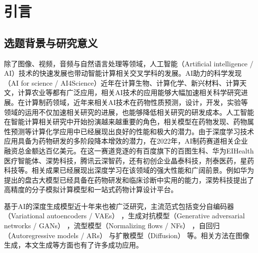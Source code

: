 \titlespacing{\chapter}{0pt}{-50pt}{0pt}
\chapter{引言}
\label{chap:introduction}
\section{选题背景与研究意义}
除了图像、视频，音频与自然语言处理等领域，人工智能（Artificial intelligence / AI）技术的快速发展也带动智能计算相关交叉学科的发展。AI助力的科学发现（AI for science / AI4Science）近年在计算生物、计算化学、新兴材料、计算天文，计算农业等都有广泛应用，相关AI技术的应用能够大幅加速相关科学研究进展。在计算制药领域，近年来相关AI技术在药物性质预测，设计，开发，实验等领域的运用不仅加速相关研究的进展，也能够降低相关研究的研发成本。人工智能在智能计算相关研究中开始扮演越来越重要的角色，相关模型在药物发现、药物属性预测等计算化学应用中已经展现出良好的性能和极大的潜力。由于深度学习技术应用具备为药物研发的多阶段降本增效的潜力，在2022年，AI制药赛道相关企业融资总金额达百亿美元。在这一赛道竞逐的有百度旗下的百图生科、华为EIHealth医疗智能体、深势科技，腾讯云深智药，还有初创企业晶泰科技，剂泰医药，星药科技等。相关成果已经展现出深度学习在该领域的强大性能和广阔前景。例如华为提出的盘古大模型已经具备在药物研发和临床诊断中实用的能力，深势科技提出了高精度的分子模拟计算模型和一站式药物计算设计平台。

基于AI的深度生成模型近十年来也被广泛研究，主流范式包括变分自编码器（Variational autoencoders / VAEs） \cite{vae_kingma_13}，生成对抗模型（Generative adversarial networks / GANs） \cite{gan_goodfellow_14}，流型模型（Normalizing flows / NFs） \cite{nice_dinh_15,density_dinh_17}，自回归（Autoregressive models / ARs） \cite{ar_oord_16}与扩散模型（Diffusion） \cite{deepunsupervised_dickstein_15,generative_song_19}等。相关方法在图像生成，本文生成等方面也有了许多成功应用。

